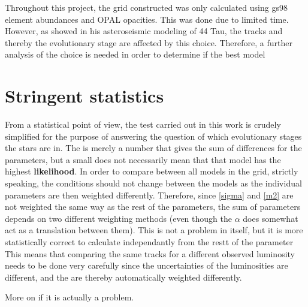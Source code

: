 \begin{itemize}

Throughout this project, the grid constructed was only calculated using gs98 element abundances and OPAL opacities. This was done due to limited time. However, as \citet{lenz2010delta} showed in his asteroseismic modeling of 44 Tau,  the tracks and thereby the evolutionary stage are affected by this choice. Therefore, a further analysis of the choice is needed in order to determine if the best model \chis 


\section{Stringent statistics}

From a statistical point of view, the \chis test carried out in this work is crudely simplified for the purpose of answering the question of which evolutionary stages the stars are in. The \chis is merely a number that gives the sum of differences for the parameters, but a small \chis does not necessarily mean that that model has the highest \textbf{likelihood}. In order to compare \chis between all models in the grid, strictly speaking, the conditions should not change between the models as the individual parameters are then weighted differently. Therefore, since \eqref{sigma} and \eqref{m2} are not weighted the same way as the rest of the parameters, the sum of parameters depends on two different weighting methods (even though the $\alpha$ does somewhat act as a translation between them). This is not a problem in itself, but it is more statistically correct to calculate \chis independantly from the restt of the parameter  This means that comparing the same tracks for a different observed luminosity needs to be done very carefully since the uncertainties of the luminosities are different, and the \chis are thereby automatically weighted differently.

More on if it is actually a problem. 

\end{itemize}
